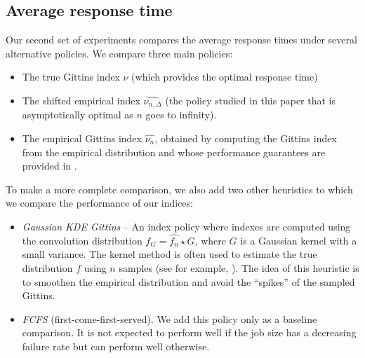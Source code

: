 \documentclass[11pt]{article}
\newcommand{\red}[1]{{\color{red}#1}}
\begin{document}
\subsection{Average response time}

Our second set of experiments compares the average response times under several alternative policies. We compare three main policies:
  \begin{itemize}
    \item The true Gittins index $\nu$ (which provides the optimal response time)
    \item The shifted empirical index $\widehat{\nu_{n,\Delta}}$ (the policy studied in this paper that is asymptotically optimal as $n$ goes to infinity).
    \item The empirical Gittins index $\widehat{\nu_n}$, obtained by computing the Gittins index from the empirical distribution and whose performance guarantees are provided in \cite{ramakrishna2026empirical}.
  \end{itemize}
  To make a more complete comparison, we also add two other heuristics to which we compare the performance of our indices:
  \begin{itemize}
    \item \emph{Gaussian KDE Gittins} -- An index policy where indexes are computed using the convolution distribution $f_G = \widehat{f_n} \star G$, where $G$ is a Gaussian kernel with a small variance.  The kernel method  is often used to estimate the true distribution $f$ using $n$ samples (see for example, \cite{Rudemo}). The idea of this heuristic is to smoothen the empirical distribution and avoid the ``spikes'' of the sampled Gittins. 
    \item \emph{FCFS} (first-come-first-served). We add this policy only as a baseline comparison. It is not expected to perform well if the job size has a decreasing failure rate but can perform well otherwise.  


    
   
  \end{itemize}
  
\end{document}
